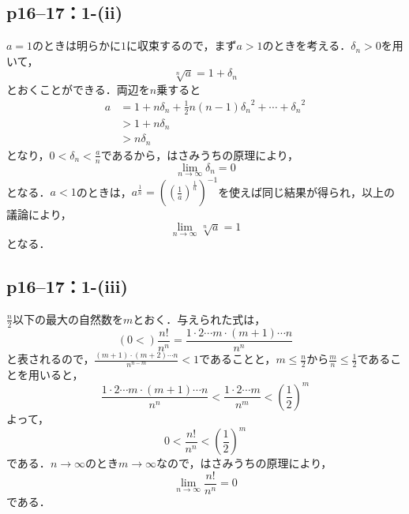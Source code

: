 \documentclass[a4paper,10pt,fleqn]{ltjsarticle}
\begin{document}
\subsection*{p16--17：1-(ii)}

\begin{tleftbar}
    $a=1$のときは明らかに$1$に収束するので，まず$a>1$のときを考える．$\delta_n >0$を用いて，
    \[
        \sqrt[n]{a} =1+\delta_n
    \]
    とおくことができる．両辺を$n$乗すると
    \begin{align*}
        a & = 1+ n \delta_n + \frac{1}{2}n(n-1) {\delta_n}^2 + \cdots + {\delta_n}^2 \\
          & >1+n \delta_n                                                            \\
          & >n \delta_n
    \end{align*}
    となり，$0<\delta_n <\frac{a}{n}$であるから，はさみうちの原理により，
    \[
        \lim_{n \to \infty} \delta_n =0
    \]
    となる．$a<1$のときは，$a^{\frac{1}{n}}=\left(\left(\frac{1}{a}\right)^{\frac{1}{n}}\right)^{-1}$を使えば同じ結果が得られ，以上の議論により，
    \[
        \lim_{n \to \infty} \sqrt[n]{a} =1
    \]
    となる．
\end{tleftbar}

\subsection*{p16--17：1-(iii)}

\begin{tleftbar}
    $\frac{n}{2}$以下の最大の自然数を$m$とおく．与えられた式は，
    \[
        \left( 0  < \right) \frac{n!}{n^n}  = \frac{1 \cdot 2 \dotsm m \cdot (m+1) \dotsm n}{n^n}
    \]
    と表されるので，$\frac{(m+1) \cdot (m+2) \dotsm n}{n^{n-m}} <1$であることと，$m \le \frac{n}{2}$から$\frac{m}{n} \le \frac{1}{2}$であることを用いると，
    \[
        \frac{1 \cdot 2 \dotsm m \cdot (m+1) \dotsm n}{n^n} < \frac{1 \cdot 2 \dotsm m}{n^m} <\left(\frac{1}{2}\right)^m
    \]
    よって，
    \[
        0 < \frac{n!}{n^n} <\left(\frac{1}{2}\right)^m
    \]
    である．$n \to \infty$のとき$m \to \infty$なので，はさみうちの原理により，
    \[
        \lim_{n \to \infty}\frac{n!}{n^n} =0
    \]
    である．
\end{tleftbar}
\end{document}
